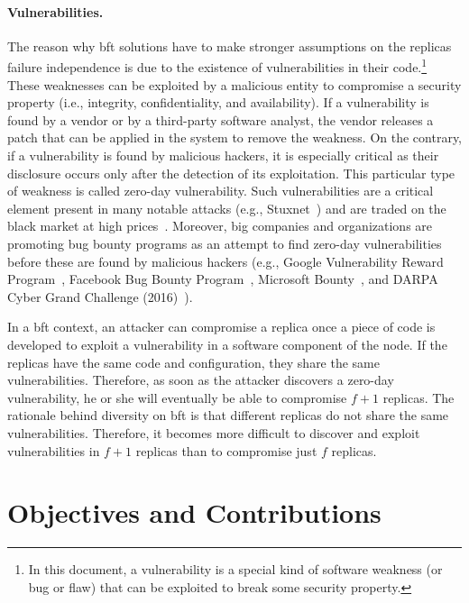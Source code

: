 \paragraph{Vulnerabilities.}
The reason why \gls{bft} solutions have to make stronger assumptions on the replicas failure independence is due to the existence of vulnerabilities in their code.\footnote{In this document, a vulnerability is a special kind of software weakness (or bug or flaw) that can be exploited to break some security property.}
These weaknesses can be exploited by a malicious entity to compromise a security property (i.e., integrity, confidentiality, and availability).
If a vulnerability is found by a vendor or by a third-party software analyst, the vendor releases a patch that can be applied in the system to remove the weakness. 
On the contrary, if a vulnerability is found by malicious hackers, it is especially critical as their disclosure occurs only after the detection of its exploitation.
This particular type of weakness is called zero-day vulnerability.
Such vulnerabilities are a critical element present in many notable attacks (e.g., Stuxnet~\cite{stuxnet:2010}) and are traded on the black market at high prices~\cite{Symantec:2017,Allodi:2017}.
Moreover, big companies and organizations are promoting bug bounty programs as an attempt to find zero-day vulnerabilities before these are found by malicious hackers (e.g., Google Vulnerability Reward Program~\cite{google_reward}, Facebook Bug Bounty Program~\cite{facebook_whitehat}, Microsoft Bounty~\cite{microsoft_bounty}, and DARPA Cyber Grand Challenge (2016)~\cite{darpa}).



In a \gls{bft} context, an attacker can compromise a replica once a piece of code is developed to exploit a vulnerability in a software component of the node.
If the replicas have the same code and configuration, they share the same vulnerabilities.
Therefore, as soon as the attacker discovers a zero-day vulnerability, he or she will eventually be able to compromise $f+1$ replicas.
The rationale behind diversity on \gls{bft} is that different replicas do not share the same vulnerabilities. 
Therefore, it becomes more difficult to discover and exploit vulnerabilities in $f+1$ replicas than to compromise just $f$ replicas.




\section{Objectives and Contributions}

